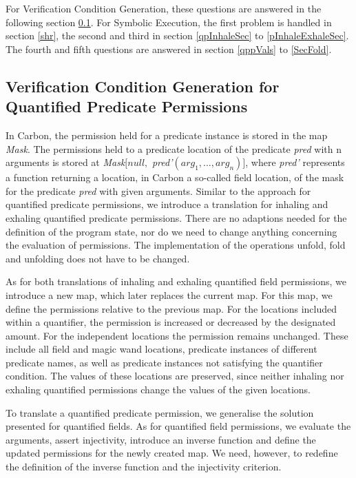 \documentclass[12pt]{article}
\begin{document}
For Verification Condition Generation, these questions are answered in the following section \ref{vcgPredicate}. For Symbolic Execution, the first problem is handled in section \ref{shr}, the second and third in section \ref{qpInhaleSec} to \ref{pInhaleExhaleSec}. The fourth and fifth questions are answered  in section \ref{qppVals} to \ref{SecFold}.

\subsection{Verification Condition Generation for Quantified Predicate Permissions}
\label{vcgPredicate}
In Carbon, the permission held for a predicate instance is stored in the map \textit{Mask}. The permissions held to a predicate location of the predicate \textit{pred} with n arguments is stored at \textit{Mask}\([null,\) \textit{pred'}\((arg_1, \dots, arg_n)]\), where \textit{pred'} represents a function returning a location, in Carbon a so-called field location, of the mask for the predicate \textit{pred} with given arguments. Similar to the approach for quantified predicate permissions, we introduce a translation for inhaling and exhaling quantified predicate permissions. There are no adaptions needed for the definition of the program state, nor do we need to change anything concerning the evaluation of  permissions. The implementation of the operations unfold, fold and unfolding does not have to be changed. 

As for both translations of inhaling and exhaling quantified field permissions, we introduce a new map, which later replaces the current map. For this map, we define the permissions relative to the previous map. For the locations included within a quantifier, the permission is increased or decreased by the designated amount. For the independent locations the permission remains unchanged. These include all field and magic wand locations, predicate instances of different predicate names, as well as predicate instances not satisfying the quantifier condition. The values of these locations are preserved, since neither inhaling nor exhaling quantified permissions change the values of the given locations.

To translate a quantified predicate permission, we generalise the solution presented for quantified fields. As for quantified field permissions, we evaluate the arguments, assert injectivity, introduce an inverse function  and define the updated permissions for the newly created map. We need, however, to redefine the definition of the inverse function and the injectivity criterion.
\end{document}
